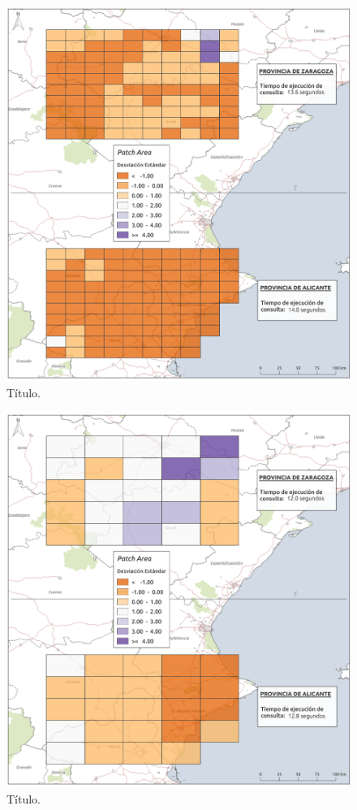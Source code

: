 \begin{figure}
\begin{center}
\includegraphics[width=\textwidth]{ResultadosyDiscusion/Figs/Results/p_50.png}
\caption{Título. \label{fig:p_50}}
\end{center}
\end{figure}

\begin{figure}
\begin{center}
\includegraphics[width=\textwidth]{ResultadosyDiscusion/Figs/Results/p_100.png}
\caption{Título. \label{fig:p_100}}
\end{center}
\end{figure}

